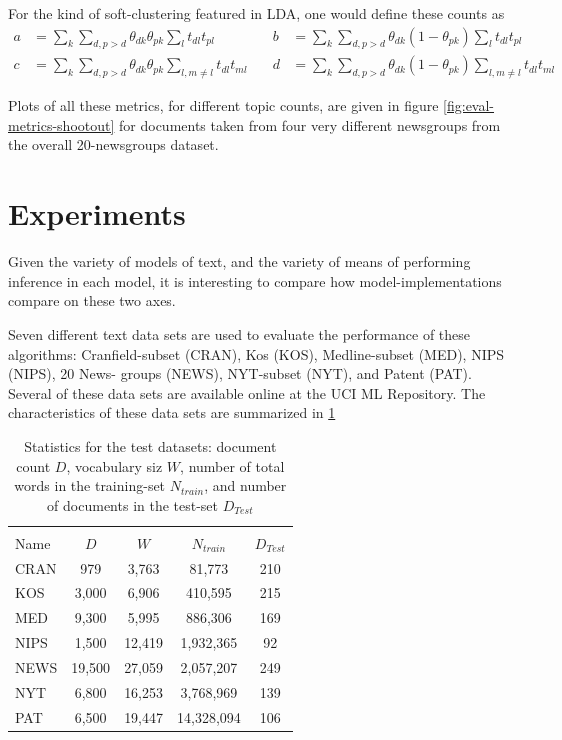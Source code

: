 For the kind of soft-clustering featured in LDA, one would define these counts as
\begin{equation}
\begin{aligned}
a & = \sum_k \sum_{d, {p>d}} \theta_{dk} \theta_{pk} \sum_l t_{dl}t_{pl} & \quad
b & = \sum_k \sum_{d, {p>d}} \theta_{dk} (1 -\theta_{pk}) \sum_l t_{dl}t_{pl}\\
c & = \sum_k \sum_{d, {p>d}} \theta_{dk} \theta_{pk} \sum_{l,m \neq l} t_{dl}t_{ml} & \quad
d & = \sum_k \sum_{d, {p>d}} \theta_{dk} (1- \theta_{pk}) \sum_{l,m \neq l} t_{dl}t_{ml}
\end{aligned}
\end{equation}

Plots of all these metrics, for different topic counts, are given in figure \ref{fig:eval-metrics-shootout} for documents taken from four very different newsgroups from the overall 20-newsgroups dataset.

\section{Experiments}
\label{sec:chap1:experiments}
Given the variety of models of text, and the variety of means of performing inference in each model, it is interesting to compare how model-implementations compare on these two axes.

Seven different text data sets are used to evaluate the performance of these algorithms: Cranfield-subset (CRAN), Kos (KOS), Medline-subset (MED), NIPS (NIPS), 20 News- groups (NEWS), NYT-subset (NYT), and Patent (PAT). Several of these data sets are available online at the UCI ML Repository. The characteristics of these data sets are summarized in \ref{chap1:tbl:datasets}

\begin{table}
\centering
\begin{tabular}{| l | c | c | c | c |}
\hline \\
Name & $D$ & $W$ & $N_{train}$ & $D_{Test}$ \\
\hline
CRAN & 979 & 3,763 & 81,773 & 210 \\
KOS & 3,000 & 6,906 & 410,595 & 215 \\
MED & 9,300 & 5,995 & 886,306 & 169 \\
NIPS & 1,500 & 12,419 & 1,932,365 & 92 \\
NEWS & 19,500 & 27,059 & 2,057,207 & 249 \\
NYT & 6,800 & 16,253 & 3,768,969 & 139 \\
PAT & 6,500 & 19,447 & 14,328,094 & 106 \\
\hline
\end{tabular}
\caption{Statistics for the test datasets: document count $D$, vocabulary siz $W$, number of total words in the training-set $N_{train}$, and number of documents in the test-set $D_{Test}$}
\label{chap1:tbl:datasets}
\end{table}

